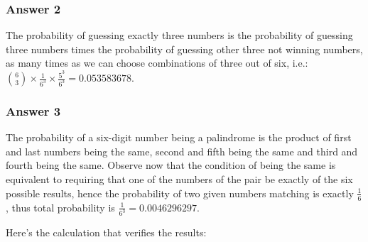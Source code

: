 \documentclass[11pt]{article}
\begin{document}
\subsubsection{Answer 2}
\label{sec-1-1-2}
The probability of guessing exactly three numbers is the probability
of guessing three numbers times the probability of guessing other three
not winning numbers, as many times as we can choose combinations of three
out of six, i.e.:
$\binom{6}{3} \times \frac{1}{6^3} \times \frac{5^3}{6^3} = \num{0.053583678}$.
\subsubsection{Answer 3}
\label{sec-1-1-3}
The probability of a six-digit number being a palindrome is the product
of first and last numbers being the same, second and fifth being the same
and third and fourth being the same.  Observe now that the condition of
being the same is equivalent to requiring that one of the numbers of the
pair be exactly of the six possible results, hence the probability of
two given numbers matching is exactly $\frac{1}{6}$, thus total probability
is $\frac{1}{6^3} = \num{0.0046296297}$.

Here's the calculation that verifies the results:
\end{document}
